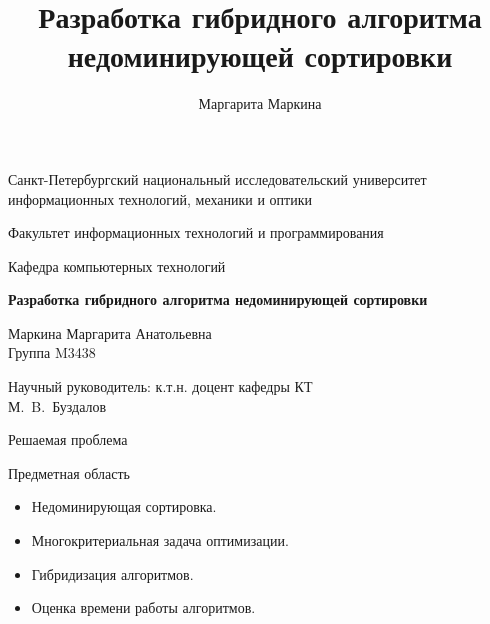 \documentclass{beamer}
\title[Недоминирующая сортировка]{Разработка гибридного алгоритма недоминирующей сортировки}
\author[Маргарита Маркина]{Маргарита Маркина}
\institute[]{Национальный исследовательский университет информационных технологий, механики и оптики}
\date{}
\begin{document}
\begin{frame}
\begin{center}
{\scriptsize Санкт-Петербургский национальный исследовательский университет \\ информационных технологий, механики и оптики}

\vspace{1cm}

{\scriptsize Факультет информационных технологий и программирования

Кафедра компьютерных технологий}

\vspace{1cm}

\vbox{\large\bfseries
Разработка гибридного алгоритма недоминирующей сортировки}

\vspace{1cm}

{\large Маркина Маргарита Анатольевна \\}
{\large Группа M3438}


\vspace{1cm}

{\large Научный руководитель: к.т.н. доцент кафедры КТ \\}
{\large М.~B.~Буздалов}


\end{center}
\end{frame}


\begin{frame}{Решаемая проблема}
\begin{block}{Предметная область}
\begin{itemize}
\item Недоминирующая сортировка.
\item Многокритериальная задача оптимизации.
\item Гибридизация алгоритмов.
\item Оценка времени работы алгоритмов.
\end{itemize}
\end{block}
\end{frame}
\end{document}
